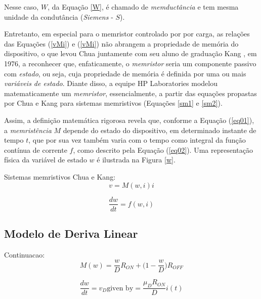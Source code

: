 \documentclass{ceel}
\begin{document}
\begin{multicols}{2}
Nesse caso, $W$, da Equação \ref{W}, é chamado de \textit{memductância} e tem mesma unidade da condutância (\textit{Siemens} - $S$).

Entretanto, em especial para o memristor controlado por por carga, as relações das Equações (\ref{vMi}) e (\ref{vMi}) não abrangem a propriedade de memória do dispositivo, o que levou Chua juntamente com seu aluno de graduação Kang \cite{1976}, em 1976, a reconhecer que, enfaticamente, o \emph{memristor} seria um componente passivo com \emph{estado}, ou seja, cuja propriedade de memória é definida por uma ou mais \emph{variáveis de estado}.
Diante disso, a equipe HP Laboratories modelou matematicamente um \emph{memristor}, essencialmente, a partir das equações propastas por Chua e Kang \cite{1976} para sistemas memristivos (Equações \ref{sm1} e \ref{sm2}).

Assim, a definição matemática rigorosa revela que, conforme a Equação (\ref{eq01}), a \emph{memristência} $M$ depende do estado do dispositivo, em determinado instante de tempo $t$, que por sua vez também varia com o tempo como integral da função contínua de corrente $f$, como descrito pela Equação (\ref{eq02}).  Uma representação física da variável de estado $w$ é ilustrada na Figura \ref{w}. 

Sistemas memristivos Chua e Kang:
\begin{equation}\label{sm1}
v=M(w, i)i
\end{equation}

\begin{equation}\label{sm2}
\dfrac{dw}{dt}=f(w, i)
\end{equation}


\subsection{Modelo de Deriva Linear}
Continuacao:
\begin{equation}\label{}
M(w)=\dfrac{w}{D}R_{ON}+\Big(1 - \dfrac{w}{D}\Big) R_{OFF}
\end{equation}

\begin{equation}\label{}
\dfrac{dw}{dt}=v_D \text{given by}=\dfrac{\mu_D R_{ON}}{D}i(t)
\end{equation}


\end{multicols}
\end{document}
